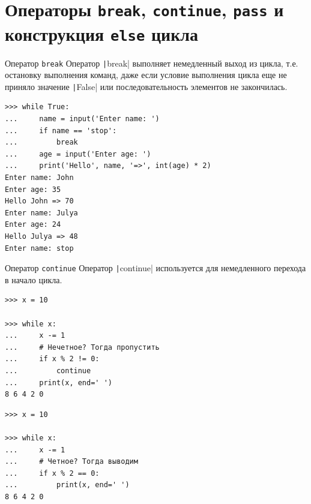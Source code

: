 \documentclass[aspectratio=169, mathserif]{beamer}	%
\begin{document}
\section{Операторы \texttt{break}, \texttt{continue}, \texttt{pass} и \\ конструкция \texttt{else} цикла}
\sectionframe


\begin{frame}[fragile]{Оператор \texttt{break}}
\scriptsize
Оператор \texttt|break| выполняет немедленный выход из цикла, т.е. остановку выполнения команд, даже если условие выполнения цикла еще не приняло значение \texttt|False| или последовательность элементов не закончилась.

\begin{verbatim}
>>> while True:
...     name = input('Enter name: ')
...     if name == 'stop':
...         break
...     age = input('Enter age: ')
...     print('Hello', name, '=>', int(age) * 2)
Enter name: John
Enter age: 35
Hello John => 70
Enter name: Julya
Enter age: 24
Hello Julya => 48
Enter name: stop
\end{verbatim}
\vfill	
\end{frame}


\begin{frame}[fragile]{Оператор \texttt{continue}}
\scriptsize	
Оператор \texttt|continue| используется для немедленного перехода в начало цикла.

\begin{multicols}{2}

\begin{verbatim}
>>> x = 10

>>> while x:
...     x -= 1
...     # Нечетное? Тогда пропустить
...     if x % 2 != 0: 
...         continue  
...     print(x, end=' ')
8 6 4 2 0
\end{verbatim}

\columnbreak

\begin{verbatim}
>>> x = 10

>>> while x:
...     x -= 1
...     # Четное? Тогда выводим
...     if x % 2 == 0:   
...         print(x, end=' ')
8 6 4 2 0
\end{verbatim}

\end{multicols}
\vfill
\end{frame}
\end{document}

